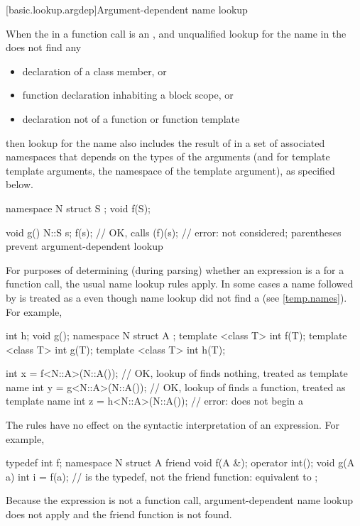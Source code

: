 [basic.lookup.argdep]{Argument-dependent name lookup}%

\pnum
When the  in
a function call is an ,
and unqualified lookup
for the name in the  does not find any
\begin{itemize}
\item
declaration of a class member, or
\item
function declaration inhabiting a block scope, or
\item
declaration not of a function or function template
\end{itemize}
then lookup for the name also includes the result of
 in a set of associated namespaces
that depends on the types of the arguments
(and for template template arguments, the namespace of the template argument),
as specified below.
\begin{example}
\begin{codeblock}
namespace N {
  struct S { };
  void f(S);
}

void g() {
  N::S s;
  f(s);             // OK, calls 
  (f)(s);           // error:  not considered; parentheses prevent argument-dependent lookup
}
\end{codeblock}
\end{example}

\pnum
\begin{note}
For purposes of determining
(during parsing) whether an expression is a
 for a function call, the usual name lookup
rules apply.
In some cases
a name followed by \tcode{<} is treated as a 
even though name lookup did not find a 
(see \ref{temp.names}).
For example,
\begin{codeblock}
int h;
void g();
namespace N {
  struct A {};
  template <class T> int f(T);
  template <class T> int g(T);
  template <class T> int h(T);
}

int x = f<N::A>(N::A());        // OK, lookup of  finds nothing,  treated as template name
int y = g<N::A>(N::A());        // OK, lookup of  finds a function,  treated as template name
int z = h<N::A>(N::A());        // error:  does not begin a 
\end{codeblock}

The rules have no effect on the syntactic interpretation of an expression.
For example,
\begin{codeblock}
typedef int f;
namespace N {
  struct A {
    friend void f(A &);
    operator int();
    void g(A a) {
      int i = f(a);             //  is the typedef, not the friend function: equivalent to 
    }
  };
}
\end{codeblock}
Because the expression is not a function call,
argument-dependent name lookup does not apply and
the friend function  is not found.
\end{note}

